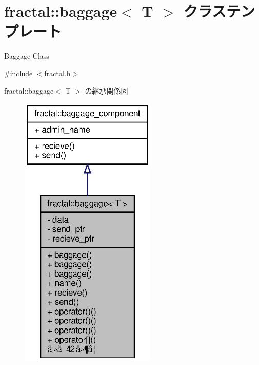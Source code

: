 \section{fractal\+:\+:baggage$<$ T $>$ クラステンプレート}
\label{classfractal_1_1baggage}


Baggage Class  




{\ttfamily \#include $<$fractal.\+h$>$}



fractal\+:\+:baggage$<$ T $>$ の継承関係図
\nopagebreak
\begin{figure}[H]
\begin{center}
\leavevmode
\includegraphics[width=184pt]{classfractal_1_1baggage__inherit__graph}
\end{center}
\end{figure}


